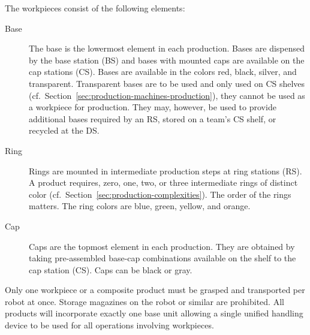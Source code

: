 \documentclass[12pt,twoside]{article}
\newcommand{\refsec}[1]{Section~\ref{#1}}
\begin{document}
\noindent
The workpieces consist of the following elements:
\begin{description}
\item[Base] The base is the lowermost element in each production.
  Bases are dispensed by the base station (BS) and bases with mounted
  caps are available on the cap stations (CS). Bases are available in
  the colors red, black, silver, and transparent. Transparent bases
  are to be used and only used on CS shelves
  (cf.~\refsec{sec:production-machines-production}), they cannot be
  used as a workpiece for production. They may, however, be used to
  provide additional bases required by an RS, stored on a team's CS
  shelf, or recycled at the DS\@.
\item[Ring] Rings are mounted in intermediate production steps at ring
  stations (RS). A product requires, zero, one, two, or three
  intermediate rings of distinct color
  (cf.~\refsec{sec:production-complexities}). The order of the rings
  matters. The ring colors are blue, green, yellow, and orange.
\item[Cap] Caps are the topmost element in each production. They are
  obtained by taking pre-assembled base-cap combinations available on
  the shelf to the cap station (CS). Caps can be black or gray.

\end{description}
Only one workpiece or a composite product must be grasped and
transported per robot at once. Storage magazines on the robot or
similar are prohibited. All products will incorporate exactly one base
unit allowing a single unified handling device to be used for all
operations involving workpieces.
\end{document}

